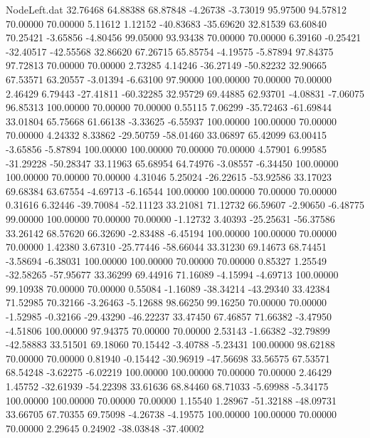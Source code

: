 \begin{filecontents}{NodeLeft.dat}
  32.76468   64.88388   68.87848    -4.26738   -3.73019   95.97500   94.57812   70.00000   70.00000    5.11612    1.12152  -40.83683  -35.69620
  32.81539   63.60840   70.25421    -3.65856   -4.80456   99.05000   93.93438   70.00000   70.00000    6.39160   -0.25421  -32.40517  -42.55568
  32.86620   67.26715   65.85754    -4.19575   -5.87894   97.84375   97.72813   70.00000   70.00000    2.73285    4.14246  -36.27149  -50.82232
  32.90665   67.53571   63.20557    -3.01394   -6.63100   97.90000  100.00000   70.00000   70.00000    2.46429    6.79443  -27.41811  -60.32285
  32.95729   69.44885   62.93701    -4.08831   -7.06075   96.85313  100.00000   70.00000   70.00000    0.55115    7.06299  -35.72463  -61.69844
  33.01804   65.75668   61.66138    -3.33625   -6.55937  100.00000  100.00000   70.00000   70.00000    4.24332    8.33862  -29.50759  -58.01460
  33.06897   65.42099   63.00415    -3.65856   -5.87894  100.00000  100.00000   70.00000   70.00000    4.57901    6.99585  -31.29228  -50.28347
  33.11963   65.68954   64.74976    -3.08557   -6.34450  100.00000  100.00000   70.00000   70.00000    4.31046    5.25024  -26.22615  -53.92586
  33.17023   69.68384   63.67554    -4.69713   -6.16544  100.00000  100.00000   70.00000   70.00000    0.31616    6.32446  -39.70084  -52.11123
  33.21081   71.12732   66.59607    -2.90650   -6.48775   99.00000  100.00000   70.00000   70.00000   -1.12732    3.40393  -25.25631  -56.37586
  33.26142   68.57620   66.32690    -2.83488   -6.45194  100.00000  100.00000   70.00000   70.00000    1.42380    3.67310  -25.77446  -58.66044
  33.31230   69.14673   68.74451    -3.58694   -6.38031  100.00000  100.00000   70.00000   70.00000    0.85327    1.25549  -32.58265  -57.95677
  33.36299   69.44916   71.16089    -4.15994   -4.69713  100.00000   99.10938   70.00000   70.00000    0.55084   -1.16089  -38.34214  -43.29340
  33.42384   71.52985   70.32166    -3.26463   -5.12688   98.66250   99.16250   70.00000   70.00000   -1.52985   -0.32166  -29.43290  -46.22237
  33.47450   67.46857   71.66382    -3.47950   -4.51806  100.00000   97.94375   70.00000   70.00000    2.53143   -1.66382  -32.79899  -42.58883
  33.51501   69.18060   70.15442    -3.40788   -5.23431  100.00000   98.62188   70.00000   70.00000    0.81940   -0.15442  -30.96919  -47.56698
  33.56575   67.53571   68.54248    -3.62275   -6.02219  100.00000  100.00000   70.00000   70.00000    2.46429    1.45752  -32.61939  -54.22398
  33.61636   68.84460   68.71033    -5.69988   -5.34175  100.00000  100.00000   70.00000   70.00000    1.15540    1.28967  -51.32188  -48.09731
  33.66705   67.70355   69.75098    -4.26738   -4.19575  100.00000  100.00000   70.00000   70.00000    2.29645    0.24902  -38.03848  -37.40002

\end{filecontents}
